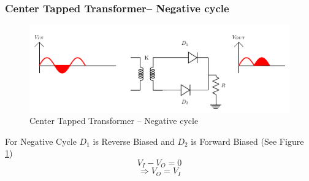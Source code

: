 			\subsubsection{Center Tapped Transformer– Negative cycle}
				\begin{figure}[h]
					\centering
					\includegraphics[width=0.9\linewidth]{img/exp7/13}
					\caption{Center Tapped Transformer – Negative cycle}
					\label{fig:fwr_centerTappedTranformer_negativeCycle}
				\end{figure}
				For Negative Cycle \(D_1\) is Reverse Biased and \(D_2\) is Forward Biased (See Figure \ref{fig:fwr_centerTappedTranformer_negativeCycle})
				$$V_I - V_O=0$$
				$$\Rightarrow V_O=V_I$$
		
